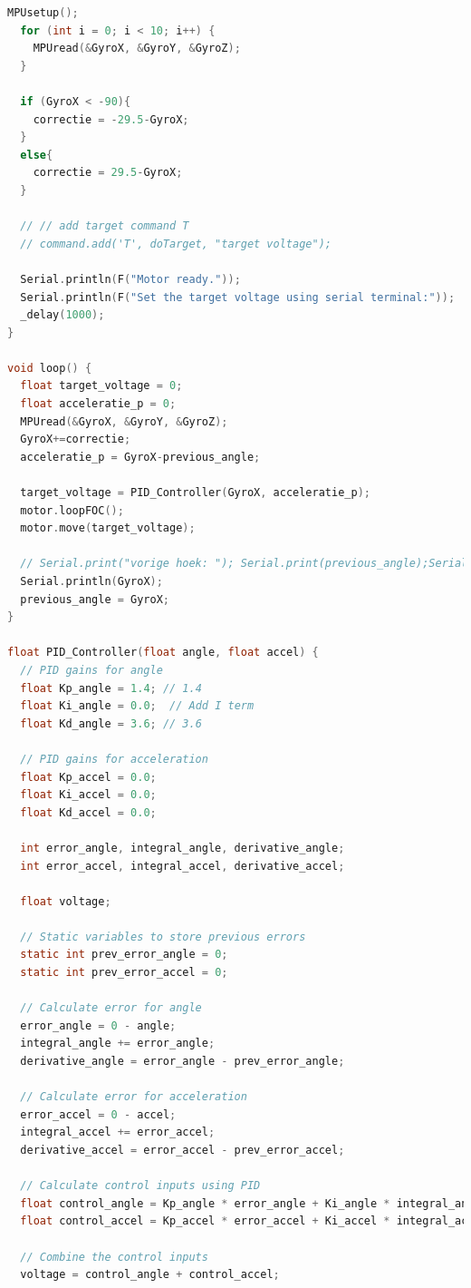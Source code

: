 \documentclass{article}
\begin{document}
\begin{lstlisting}[language=C, caption=Arduino Nano Code]
    MPUsetup();
  for (int i = 0; i < 10; i++) {
    MPUread(&GyroX, &GyroY, &GyroZ);
  }

  if (GyroX < -90){
    correctie = -29.5-GyroX;
  }
  else{
    correctie = 29.5-GyroX;
  }

  // // add target command T
  // command.add('T', doTarget, "target voltage");

  Serial.println(F("Motor ready."));
  Serial.println(F("Set the target voltage using serial terminal:"));
  _delay(1000);
}

void loop() {
  float target_voltage = 0;
  float acceleratie_p = 0;
  MPUread(&GyroX, &GyroY, &GyroZ);
  GyroX+=correctie;
  acceleratie_p = GyroX-previous_angle;

  target_voltage = PID_Controller(GyroX, acceleratie_p);
  motor.loopFOC();
  motor.move(target_voltage);

  // Serial.print("vorige hoek: "); Serial.print(previous_angle);Serial.print(" hoek: "); Serial.print(GyroX);Serial.print(" acceleratie: "); Serial.println(acceleratie_p);
  Serial.println(GyroX);
  previous_angle = GyroX;
}

float PID_Controller(float angle, float accel) {
  // PID gains for angle
  float Kp_angle = 1.4; // 1.4
  float Ki_angle = 0.0;  // Add I term
  float Kd_angle = 3.6; // 3.6

  // PID gains for acceleration
  float Kp_accel = 0.0;
  float Ki_accel = 0.0;
  float Kd_accel = 0.0;
  
  int error_angle, integral_angle, derivative_angle;
  int error_accel, integral_accel, derivative_accel;
  
  float voltage;

  // Static variables to store previous errors
  static int prev_error_angle = 0;
  static int prev_error_accel = 0;

  // Calculate error for angle
  error_angle = 0 - angle;
  integral_angle += error_angle;
  derivative_angle = error_angle - prev_error_angle;

  // Calculate error for acceleration
  error_accel = 0 - accel;
  integral_accel += error_accel;
  derivative_accel = error_accel - prev_error_accel;

  // Calculate control inputs using PID
  float control_angle = Kp_angle * error_angle + Ki_angle * integral_angle + Kd_angle * derivative_angle;
  float control_accel = Kp_accel * error_accel + Ki_accel * integral_accel + Kd_accel * derivative_accel;

  // Combine the control inputs
  voltage = control_angle + control_accel;


\end{lstlisting}
\end{document}
